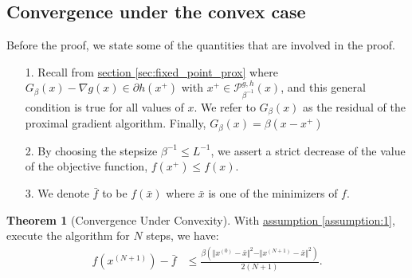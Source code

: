 \documentclass[]{article}
\theoremstyle{definition}
\newtheorem{theorem}{Theorem}       %
\begin{document}
    \subsection{Convergence under the convex case}
        Before the proof, we state some of the quantities that are involved in the proof. 
        \begin{enumerate}
            \item [1.] Recall from \hyperref[sec:fixed_point_prox]{section \ref*{sec:fixed_point_prox}} where $G_\beta(x) - \nabla g(x) \in \partial h(x^+)$ with $x^+ \in \mathcal P_{\beta^{-1}}^{g, h}(x)$, and this general condition is true for all values of $x$. We refer to $G_\beta(x)$ as the residual of the proximal gradient algorithm. Finally, $G_\beta(x) = \beta(x - x^+)$
            \item [2.] By choosing the stepsize $\beta^{-1} \le L^{-1}$, we assert a strict decrease of the value of the objective function, $f(x^+) \le f(x)$. 
            \item [3.] We denote $\bar f$ to be $f(\bar x)$ where $\bar x$ is one of the minimizers of $f$. 
        \end{enumerate}
        \begin{theorem}[Convergence Under Convexity]\label{thm:convergence_non_accelerated}
            With \hyperref[assumption:1]{assumption \ref*{assumption:1}}, execute the algorithm for $N$ steps, we have: 
            \begin{align*}
                f(x^{(N + 1)}) - \bar f
                &\le  
                \frac{\beta(\Vert x^{(0)} - \bar x\Vert^2 - \Vert x^{(N + 1)} - \bar x\Vert^2)}{2(N + 1)}. 
            \end{align*}
        \end{theorem}
\end{document}
